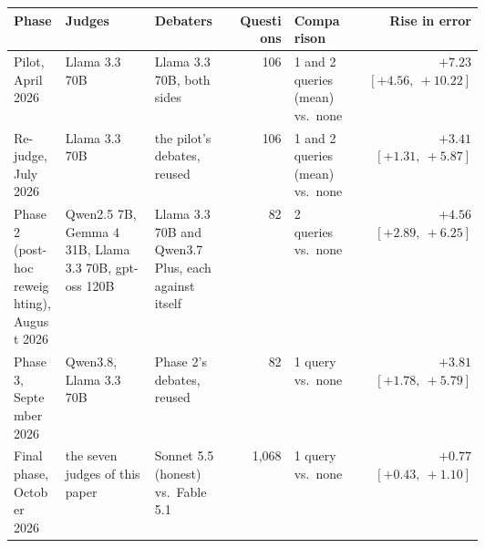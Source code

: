 \begin{tabular}{@{}p{0.11\linewidth}p{0.19\linewidth}p{0.17\linewidth}rp{0.13\linewidth}r@{}}
\toprule
Phase & Judges & Debaters & Questions & Comparison & Rise in error \\
\midrule
Pilot, April 2026 & Llama 3.3 70B & Llama 3.3 70B, both sides & 106 & 1 and 2 queries (mean) vs.\ none & $+7.23$ $[+4.56,\ +10.22]$ \\
\addlinespace
Re-judge, July 2026 & Llama 3.3 70B & the pilot's debates, reused & 106 & 1 and 2 queries (mean) vs.\ none & $+3.41$ $[+1.31,\ +5.87]$ \\
\addlinespace
Phase 2 (post-hoc reweighting), August 2026 & Qwen2.5 7B, Gemma 4 31B, Llama 3.3 70B, gpt-oss 120B & Llama 3.3 70B and Qwen3.7 Plus, each against itself & 82 & 2 queries vs.\ none & $+4.56$ $[+2.89,\ +6.25]$ \\
\addlinespace
Phase 3, September 2026 & Qwen3.8, Llama 3.3 70B & Phase 2's debates, reused & 82 & 1 query vs.\ none & $+3.81$ $[+1.78,\ +5.79]$ \\
\addlinespace
Final phase, October 2026 & the seven judges of this paper & Sonnet 5.5 (honest) vs.\ Fable 5.1 & 1,068 & 1 query vs.\ none & $+0.77$ $[+0.43,\ +1.10]$ \\
\bottomrule
\end{tabular}
